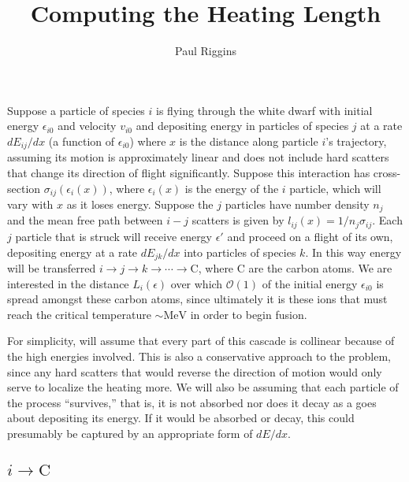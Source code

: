 \documentclass{article}
\title{Computing the Heating Length}
\author{Paul Riggins}
\newcommand{\OO}{\mathcal{O}}
\begin{document}
\maketitle{}

Suppose a particle of species $i$ is flying through the white dwarf with initial energy $\epsilon_{i0}$ and velocity $v_{i0}$ and depositing energy in particles of species $j$ at a rate $dE_{ij}/dx$ (a function of $\epsilon_{i0}$) where $x$ is the distance along particle $i$'s trajectory, assuming its motion is approximately linear and does not include hard scatters that change its direction of flight significantly. Suppose this interaction has cross-section $\sigma_{ij}(\epsilon_i(x))$, where $\epsilon_i(x)$ is the energy of the $i$ particle, which will vary with $x$ as it loses energy. Suppose the $j$ particles have number density $n_j$ and the mean free path between $i-j$ scatters is given by $l_{ij}(x) = 1/n_j \sigma_{ij}$. Each $j$ particle that is struck will receive energy $\epsilon'$ and proceed on a flight of its own, depositing energy at a rate $dE_{jk}/dx$ into particles of species $k$. In this way energy will be transferred $i\to j\to k\to\cdots\to \text{C}$, where $\text{C}$ are the carbon atoms. We are interested in the distance $L_i(\epsilon)$ over which $\OO(1)$ of the initial energy $\epsilon_{i0}$ is spread amongst these carbon atoms, since ultimately it is these ions that must reach the critical temperature $\sim \text{MeV}$ in order to begin fusion.

For simplicity, will assume that every part of this cascade is collinear because of the high energies involved. This is also a conservative approach to the problem, since any hard scatters that would reverse the direction of motion would only serve to localize the heating more. We will also be assuming that each particle of the process ``survives,'' that is, it is not absorbed nor does it decay as a goes about depositing its energy. If it would be absorbed or decay, this could presumably be captured by an appropriate form of $dE/dx$.

\subsection{$i\to\text{C}$}
\end{document}

